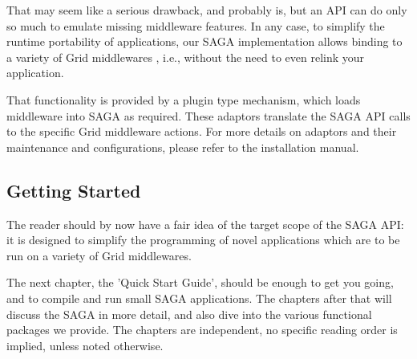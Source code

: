    That may seem like a serious drawback, and probably is, but an API
   can do only so much to emulate missing middleware features.  In any
   case, to simplify the runtime portability of applications, our SAGA
   implementation allows binding to a variety of Grid middlewares
   , i.e., without the need to even relink your
   application.


   That functionality is provided by a plugin type mechanism, which
   loads middleware  into SAGA as required.  These
   adaptors translate the SAGA API calls to the specific Grid
   middleware actions.  For more details on adaptors and their
   maintenance and configurations, please refer to the installation
   manual.


 \subsection{Getting Started}

  The reader should by now have a fair idea of the target scope of the
  SAGA API: it is designed to simplify the programming of novel
  applications which are to be run on a variety of Grid middlewares.

  The next chapter, the 'Quick Start Guide', should be enough to get
  you going, and to compile and run small SAGA applications.  The
  chapters after that will discuss the SAGA \LF in more detail, and
  also dive into the various functional packages we provide.  The chapters are independent, no specific reading order is implied, unless noted otherwise.

